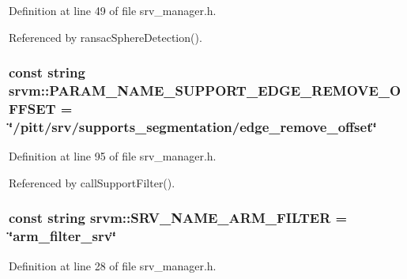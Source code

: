 Definition at line 49 of file srv\-\_\-manager.\-h.



Referenced by ransac\-Sphere\-Detection().

\hypertarget{namespacesrvm_a07211b3f36f93931af6e67097b75f145}{
\subsubsection[{P\-A\-R\-A\-M\-\_\-\-N\-A\-M\-E\-\_\-\-S\-U\-P\-P\-O\-R\-T\-\_\-\-E\-D\-G\-E\-\_\-\-R\-E\-M\-O\-V\-E\-\_\-\-O\-F\-F\-S\-E\-T}]{\setlength{\rightskip}{0pt plus 5cm}const string srvm\-::\-P\-A\-R\-A\-M\-\_\-\-N\-A\-M\-E\-\_\-\-S\-U\-P\-P\-O\-R\-T\-\_\-\-E\-D\-G\-E\-\_\-\-R\-E\-M\-O\-V\-E\-\_\-\-O\-F\-F\-S\-E\-T = \char`\"{}/pitt/srv/supports\-\_\-segmentation/edge\-\_\-remove\-\_\-offset\char`\"{}}}\label{namespacesrvm_a07211b3f36f93931af6e67097b75f145}


Definition at line 95 of file srv\-\_\-manager.\-h.



Referenced by call\-Support\-Filter().

\hypertarget{namespacesrvm_ac0600b046091267fd4d0aed25786961f}{
\subsubsection[{S\-R\-V\-\_\-\-N\-A\-M\-E\-\_\-\-A\-R\-M\-\_\-\-F\-I\-L\-T\-E\-R}]{\setlength{\rightskip}{0pt plus 5cm}const string srvm\-::\-S\-R\-V\-\_\-\-N\-A\-M\-E\-\_\-\-A\-R\-M\-\_\-\-F\-I\-L\-T\-E\-R = \char`\"{}arm\-\_\-filter\-\_\-srv\char`\"{}}}\label{namespacesrvm_ac0600b046091267fd4d0aed25786961f}


Definition at line 28 of file srv\-\_\-manager.\-h.




